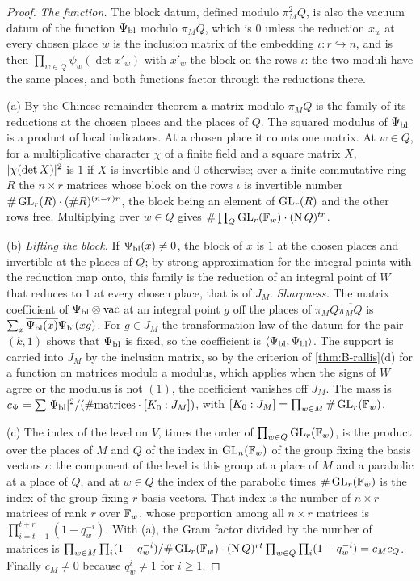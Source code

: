 \begin{proof}
\emph{The function.} The block datum, defined modulo $\pi_M^2Q$, is also the vacuum datum of the function $\Psi_{\rm bl}$ modulo $\pi_MQ$, which is $0$ unless the reduction $x_w$ at every chosen place $w$ is the inclusion matrix of the embedding
$\iota\colon r\hookrightarrow n$, and is then $\prod_{w\in Q}\psi_w(\det x'_w)$ with $x'_w$ the block on the rows $\iota$: the two moduli have the same places, and both functions factor through the reductions there.

(a) By the Chinese remainder theorem a matrix modulo $\pi_MQ$ is the family of its reductions at the chosen places and the places of $Q$. The squared modulus of $\Psi_{\rm bl}$ is a product of local indicators. At a chosen place it counts one
matrix. At $w\in Q$, for a multiplicative character $\chi$ of a finite field and a square matrix $X$, $\lvert \chi(\det X)\rvert^2$ is $1$ if $X$ is invertible and $0$ otherwise; over a finite commutative ring $R$ the $n\times r$ matrices whose block on
the rows $\iota$ is invertible number $\#\operatorname{GL}_r(R)\cdot(\#R)^{(n-r)r}$, the block being an element of $\operatorname{GL}_r(R)$ and the other rows free. Multiplying over $w\in Q$ gives $\#\prod_Q\operatorname{GL}_r(\mathbb{F}_w)\cdot(\operatorname{N} Q)^{tr}$.

(b) \emph{Lifting the block.} If $\Psi_{\rm bl}(x)\ne0$, the block of $x$ is $1$ at the chosen places and invertible at the places of $Q$; by strong approximation for the integral points with the reduction map onto, this family is the reduction of an integral
point of $W$ that reduces to $1$ at every chosen place, that is of $J_M$. \emph{Sharpness.} The matrix coefficient of $\Psi_{\rm bl}\otimes\mathrm{vac}$ at an integral point $g$ off the places of $\pi_MQ\overline{\pi_MQ}$ is
$\sum_x\overline{\Psi_{\rm bl}(x)}\Psi_{\rm bl}(xg)$. For $g\in J_M$ the transformation law of the datum for the pair $(k,1)$ shows that $\Psi_{\rm bl}$ is fixed, so the coefficient is $\langle\Psi_{\rm bl},\Psi_{\rm bl}\rangle$. The support is carried into $J_M$ by
the inclusion matrix, so by the criterion of \cref{thm:B-rallis}(d) for a function on matrices modulo a modulus, which applies when the signs of $W$ agree or the modulus is not $(1)$, the coefficient vanishes off $J_M$. The mass is
$c_\Psi=\sum\lvert \Psi_{\rm bl}\rvert^2/(\#\text{matrices}\cdot[K_0:J_M])$, with $[K_0:J_M]=\prod_{w\in M}\#\operatorname{GL}_r(\mathbb{F}_w)$.

(c) The index of the level on $V$, times the order of $\prod_{w\in Q}\operatorname{GL}_r(\mathbb{F}_w)$, is the product over the places of $M$ and $Q$ of the index in $\operatorname{GL}_n(\mathbb{F}_w)$ of the group fixing the basis vectors $\iota$: the component of the level is this
group at a place of $M$ and a parabolic at a place of $Q$, and at $w\in Q$ the index of the parabolic times $\#\operatorname{GL}_r(\mathbb{F}_w)$ is the index of the group fixing $r$ basis vectors. That index is the number of $n\times r$ matrices of rank $r$ over
$\mathbb{F}_w$, whose proportion among all $n\times r$ matrices is $\prod_{i=t+1}^{t+r}(1-q_w^{-i})$. With (a), the Gram factor divided by the number of matrices is $\prod_{w\in M}\prod_i(1-q_w^{-i})/\#\operatorname{GL}_r(\mathbb{F}_w)\cdot(\operatorname{N} Q)^{rt}\prod_{w\in Q}\prod_i(1-q_w^{-i})=c_Mc_Q$.
Finally $c_M\ne0$ because $q_w^i\ne1$ for $i\ge1$.
\end{proof}

